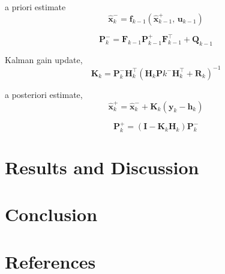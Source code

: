 \documentclass{ieeeaccess}
\begin{document}
	a priori estimate
	\begin{equation}
	\label{eq:x-}
		\hat{\boldsymbol{x}}_{k}^{-}=\boldsymbol{f}_{k-1}\left(\hat{\boldsymbol{x}}^{+}_{k-1},\,\boldsymbol{u}_{k-1}\right)
	\end{equation}
	
	\begin{equation}
	\label{eq:P+}
		\boldsymbol{P}_{k}^{-} = \boldsymbol{F}_{k-1}\boldsymbol{P}_{k-1}^{+}\boldsymbol{F}_{k-1}^{\top} + \boldsymbol{Q}_{k-1}
	\end{equation}
	
	Kalman gain update,
	\begin{equation}
	\label{eq:K}
		\boldsymbol{K}_{k} = \boldsymbol{P}_{k}^{-}\boldsymbol{H}_{k}^{\top}\left(\boldsymbol{H}_{k}\boldsymbol{P}{k}^{-}\boldsymbol{H}_{k}^{\top} + \boldsymbol{R}_{k} \right)^{-1}
	\end{equation}
	
	a posteriori estimate,
	\begin{equation}
	\label{eq:x+}
		\hat{\boldsymbol{x}}_{k}^{+}=\hat{\boldsymbol{x}}_{k}^{-} + \boldsymbol{K}_{k}\left(\boldsymbol{y}_{k}- \boldsymbol{h}_{k}\right)
	\end{equation}
	
	\begin{equation}
	\label{eq:p+}
		\boldsymbol{P}_{k}^{+} = \left(\boldsymbol{I} - \boldsymbol{K}_{k}\boldsymbol{H}_{k}\right)\boldsymbol{P}_{k}^{-}
	\end{equation}
	
\section{Results and Discussion}
\label{sec:res}


\section{Conclusion}
\label{sec:con}


\section{References}

\EOD
\end{document}

